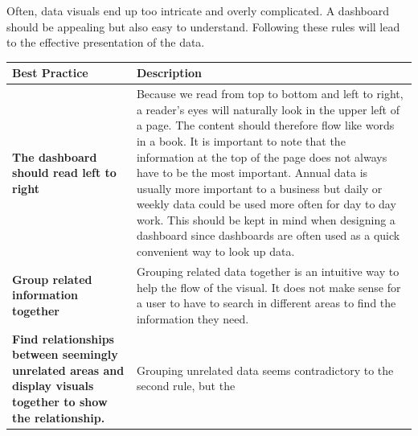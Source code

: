 \documentclass[]{book}
\theoremstyle{definition}
\theoremstyle{definition}
\theoremstyle{definition}
\theoremstyle{remark}
\begin{document}
Often, data visuals end up too intricate and overly complicated. A
dashboard should be appealing but also easy to understand. Following
these rules will lead to the effective presentation of the data.

\begin{longtable}[]{@{}ll@{}}
\toprule
\begin{minipage}[b]{0.17\columnwidth}\raggedright\strut
Best Practice\strut
\end{minipage} & \begin{minipage}[b]{0.72\columnwidth}\raggedright\strut
Description\strut
\end{minipage}\tabularnewline
\midrule
\endhead
\begin{minipage}[t]{0.17\columnwidth}\raggedright\strut
\textbf{The dashboard should read left to right}\strut
\end{minipage} & \begin{minipage}[t]{0.72\columnwidth}\raggedright\strut
Because we read from top to bottom and left to right, a reader's eyes
will naturally look in the upper left of a page. The content should
therefore flow like words in a book. It is important to note that the
information at the top of the page does not always have to be the most
important. Annual data is usually more important to a business but daily
or weekly data could be used more often for day to day work. This should
be kept in mind when designing a dashboard since dashboards are often
used as a quick convenient way to look up data.\strut
\end{minipage}\tabularnewline
\begin{minipage}[t]{0.17\columnwidth}\raggedright\strut
\textbf{Group related information together}\strut
\end{minipage} & \begin{minipage}[t]{0.72\columnwidth}\raggedright\strut
Grouping related data together is an intuitive way to help the flow of
the visual. It does not make sense for a user to have to search in
different areas to find the information they need.\strut
\end{minipage}\tabularnewline
\begin{minipage}[t]{0.17\columnwidth}\raggedright\strut
\textbf{Find relationships between seemingly unrelated areas and display
visuals together to show the relationship.}\strut
\end{minipage} & \begin{minipage}[t]{0.72\columnwidth}\raggedright\strut
Grouping unrelated data seems contradictory to the second rule, but the

\end{minipage}
\end{longtable}
\end{document}
